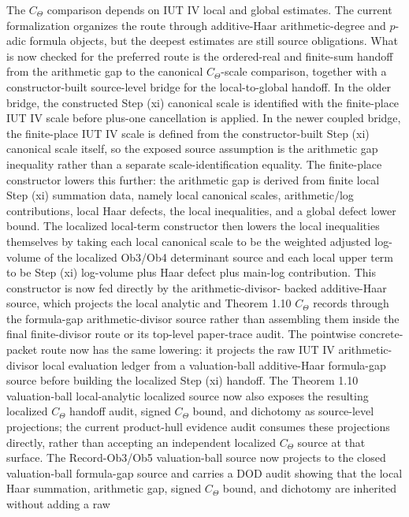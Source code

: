 \documentclass[11pt]{article}
\newcommand{\IUT}{IUT}
\newcommand{\CTheta}{C_\Theta}
\theoremstyle{plain}
\theoremstyle{definition}
\theoremstyle{remark}
\begin{document}
The \(\CTheta\) comparison depends on \IUT{} IV local and global estimates.
The current formalization organizes the route through additive-Haar
arithmetic-degree and \(p\)-adic formula objects, but the deepest estimates are
still source obligations.  What is now checked for the preferred route is the
ordered-real and finite-sum handoff from the arithmetic gap to the canonical
\(\CTheta\)-scale comparison, together with a constructor-built source-level
bridge for the local-to-global handoff.  In the older bridge, the constructed
Step (xi) canonical scale is identified with the finite-place IUT IV scale
before plus-one cancellation is applied.  In the newer coupled bridge, the
finite-place IUT IV scale is defined from the constructor-built Step (xi)
canonical scale itself, so the exposed source assumption is the arithmetic gap
inequality rather than a separate scale-identification equality.  The
finite-place constructor lowers this further: the arithmetic gap is derived
from finite local Step (xi) summation data, namely local canonical scales,
arithmetic/log contributions, local Haar defects, the local inequalities, and a
global defect lower bound.  The localized local-term constructor then lowers the
local inequalities themselves by taking each local canonical scale to be the
weighted adjusted log-volume of the localized Ob3/Ob4 determinant source and
each local upper term to be Step (xi) log-volume plus Haar defect plus main-log
contribution.  This constructor is now fed directly by the arithmetic-divisor-
backed additive-Haar source, which projects the local analytic and Theorem 1.10
\(C_{\Theta}\) records through the formula-gap arithmetic-divisor source rather
than assembling them inside the final finite-divisor route or its top-level
paper-trace audit.  The pointwise concrete-packet route now has the same
lowering: it projects the raw IUT IV arithmetic-divisor local evaluation
ledger from a valuation-ball additive-Haar formula-gap source before building
the localized Step (xi) handoff.  The Theorem 1.10 valuation-ball
local-analytic localized source now also exposes the resulting localized
\(C_\Theta\) handoff audit, signed \(C_\Theta\) bound, and dichotomy as
source-level projections; the current product-hull evidence audit consumes
these projections directly, rather than accepting an independent localized
\(C_\Theta\) source at that surface.  The Record-Ob3/Ob5 valuation-ball source
now projects to the closed valuation-ball formula-gap source and carries a
DOD audit showing that the local Haar summation, arithmetic gap,
signed \(C_\Theta\) bound, and dichotomy are inherited without adding a raw
\end{document}
